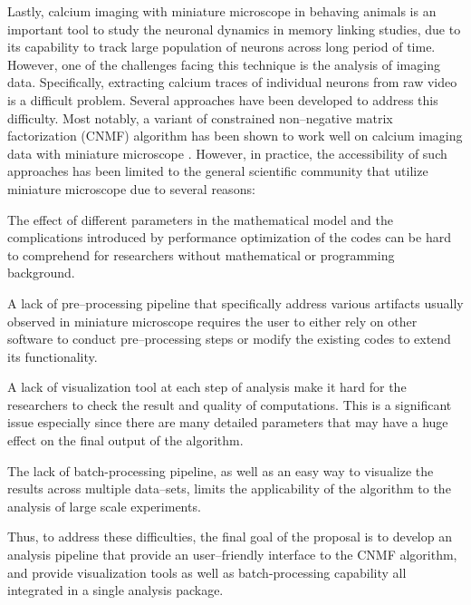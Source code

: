 \documentclass[master.tex]{subfiles}
\begin{document}
Lastly, calcium imaging with miniature microscope in behaving animals is an
important tool to study the neuronal dynamics in memory linking studies, due to
its capability to track large population of neurons across long period of time.
However, one of the challenges facing this technique is the analysis of imaging
data. Specifically, extracting calcium traces of individual neurons from raw
video is a difficult problem. Several approaches have been developed to address
this difficulty. Most notably, a variant of constrained non--negative matrix
factorization (CNMF) algorithm has been shown to work well on calcium imaging
data with miniature microscope \cite{pnevmatikakis_simultaneous_2016,
  zhou_efficient_2016}. However, in practice, the accessibility of such
approaches has been limited to the general scientific community that utilize
miniature microscope due to several reasons:
\begin{inparaenum}[a)]
\item The effect of different parameters in the mathematical model and the
  complications introduced by performance optimization of the codes can be hard
  to comprehend for researchers without mathematical or programming background.
\item A lack of pre--processing pipeline that specifically address various
  artifacts usually observed in miniature microscope requires the user to either
  rely on other software to conduct pre--processing steps or modify the existing
  codes to extend its functionality.
\item A lack of visualization tool at each step of analysis make it hard for the
  researchers to check the result and quality of computations. This is a
  significant issue especially since there are many detailed parameters that may
  have a huge effect on the final output of the algorithm.
\item The lack of batch-processing pipeline, as well as an easy way to visualize
  the results across multiple data--sets, limits the applicability of the
  algorithm to the analysis of large scale experiments.
\end{inparaenum}
Thus, to address these difficulties, the final goal of the proposal is to
develop an analysis pipeline that provide an user--friendly interface to the
CNMF algorithm, and provide visualization tools as well as batch-processing
capability all integrated in a single analysis package.
\end{document}
